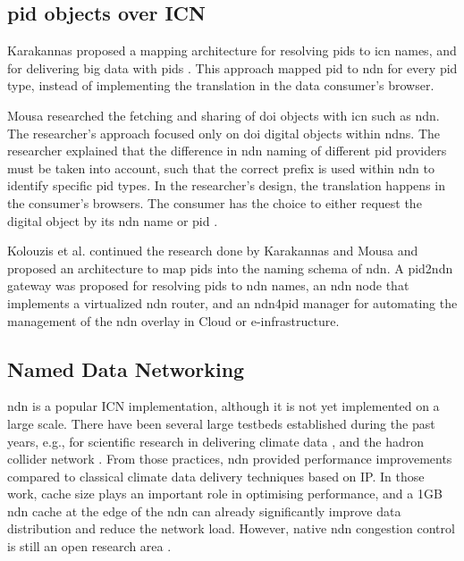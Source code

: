 \documentclass[conference]{IEEEtran}
\begin{document}

\subsection{\gls{pid} objects over ICN}
Karakannas proposed a mapping architecture for resolving \glspl{pid} to \gls{icn} names, and  for delivering big data with \glspl{pid} \cite{icn-bd}. This approach mapped \gls{pid} to \gls{ndn} for every \gls{pid} type, instead of implementing the translation in the data consumer's browser.

Mousa researched the fetching and sharing of \gls{doi} objects with \gls{icn} such as \gls{ndn}. The researcher's approach focused only on \gls{doi} digital objects within \glspl{ndn}. The researcher explained that the difference in \gls{ndn} naming of different \gls{pid} providers must be taken into account, such that the correct prefix is used within \gls{ndn} to identify specific \gls{pid} types. In the researcher's design, the translation happens in the consumer's browsers. The consumer has the choice to either request the digital object by its \gls{ndn} name or \gls{pid} \cite{ndn-app-aware}.

Kolouzis et al. continued the research done by Karakannas \cite{icn-bd} and Mousa \cite{ndn-app-aware} and proposed an architecture to map \glspl{pid} into the naming schema of \gls{ndn}. A \gls{pid}2\gls{ndn} gateway was proposed for resolving \glspl{pid} to \gls{ndn} names, an \gls{ndn} node that implements a virtualized \gls{ndn} router, and an \gls{ndn}4\gls{pid} manager for automating the management of the \gls{ndn} overlay in Cloud or e-infrastructure.

\subsection{Named Data Networking}
\gls{ndn} is a popular ICN implementation, although it is not yet implemented on a large scale. There have been several large testbeds established during the past years, e.g., for scientific research in delivering climate data \cite{lim2018ndn}, and the hadron collider network \cite{shannigrahi2015named}. From those practices, \gls{ndn} provided performance improvements compared to classical climate data delivery techniques based on IP. In those work, cache size plays an important role in optimising performance, and a 1GB \gls{ndn} cache at the edge of the \gls{ndn} can already significantly improve data distribution and reduce the network load. However, native \gls{ndn} congestion control is still an open research area \cite{ren2016congestion}.
 
\end{document}
